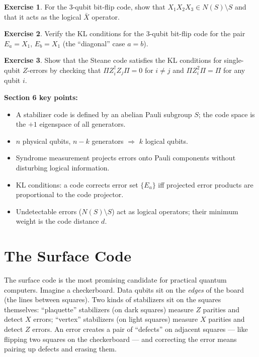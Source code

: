 \documentclass[11pt, a4paper]{article}
\theoremstyle{definition}
\newtheorem{exercise}{Exercise}[section]
\theoremstyle{plain}
\theoremstyle{remark}
\begin{document}
\begin{exercise}
For the 3-qubit bit-flip code, show that $X_1 X_2 X_3 \in N(S) \setminus S$
and that it acts as the logical $\bar{X}$ operator.
\end{exercise}

\begin{exercise}
Verify the KL conditions for the 3-qubit bit-flip code for the pair
$E_a = X_1$, $E_b = X_1$ (the ``diagonal'' case $a = b$).
\end{exercise}

\begin{exercise}
Show that the Steane code satisfies the KL conditions for single-qubit
$Z$-errors by checking that $\Pi Z_i^\dagger Z_j \Pi = 0$ for $i \neq j$
and $\Pi Z_i^2 \Pi = \Pi$ for any qubit $i$.
\end{exercise}

\begin{summarybox}
\textbf{Section 6 key points:}
\begin{itemize}
  \item A stabilizer code is defined by an abelian Pauli subgroup $S$; the
        code space is the $+1$ eigenspace of all generators.
  \item $n$ physical qubits, $n-k$ generators $\Rightarrow$ $k$ logical qubits.
  \item Syndrome measurement projects errors onto Pauli components without
        disturbing logical information.
  \item KL conditions: a code corrects error set $\{E_a\}$ iff projected
        error products are proportional to the code projector.
  \item Undetectable errors ($N(S)\setminus S$) act as logical operators;
        their minimum weight is the code distance $d$.
\end{itemize}
\end{summarybox}

\newpage
\section{The Surface Code}
\label{sec:surface}

\begin{intuition}
The surface code is the most promising candidate for practical quantum
computers.  Imagine a checkerboard.  Data qubits sit on the \emph{edges} of
the board (the lines between squares).  Two kinds of stabilizers sit on the
squares themselves: ``plaquette'' stabilizers (on dark squares) measure $Z$
parities and detect $X$ errors; ``vertex'' stabilizers (on light squares)
measure $X$ parities and detect $Z$ errors.  An error creates a pair of
``defects'' on adjacent squares --- like flipping two squares on the
checkerboard --- and correcting the error means pairing up defects and erasing
them.
\end{intuition}
\end{document}
